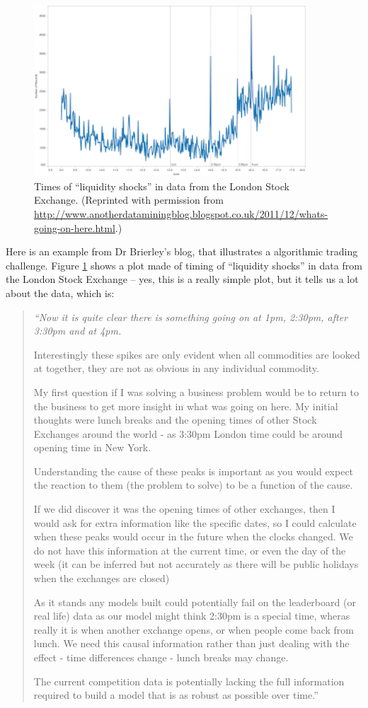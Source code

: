\documentclass{article}
\begin{document}
\begin{figure}[htp]
\centerline{\includegraphics[width=4in]{images/shockeventtimings.png}}
\caption{Times of ``liquidity shocks'' in data from the London Stock Exchange. (Reprinted with permission from \url{http://www.anotherdataminingblog.blogspot.co.uk/2011/12/whats-going-on-here.html}.)}
\label{liqshock}
\end{figure}

Here is an example from Dr Brierley's blog, that illustrates a algorithmic trading challenge. Figure \ref{liqshock} shows a plot made of timing of ``liquidity shocks'' in data from the London Stock Exchange -- yes, this is a really simple plot, but it tells us a lot about the data, which is:

\begin{quote}
{\em ``Now it is quite clear there is something going on at 1pm, 2:30pm, after 3:30pm and at 4pm.

Interestingly these spikes are only evident when all commodities are looked at together, they are not as obvious in any individual commodity.

My first question if I was solving a business problem would be to return to the business to get more insight in what was going on here. My initial thoughts were lunch breaks and the opening times of other Stock Exchanges around the world - as 3:30pm London time could be around opening time in New York.

Understanding the cause of these peaks is important as you would expect the reaction to them (the problem to solve) to be a function of the cause.

If we did discover it was the opening times of other exchanges, then I would ask for extra information like the specific dates, so I could calculate when these peaks would occur in the future when the clocks changed. We do not have this information at the current time, or even the day of the week (it can be inferred but not accurately as there will be public holidays when the exchanges are closed) 

As it stands any models built could potentially fail on the leaderboard (or real life) data as our model might think 2:30pm is a special time, wheras really it is when another exchange opens, or when people come back from lunch. We need this causal information rather than just dealing with the effect - time differences change - lunch breaks may change.

The current competition data is potentially lacking the full information required to build a model that is as robust as possible over time.'' }
\end{quote}
\end{document}
